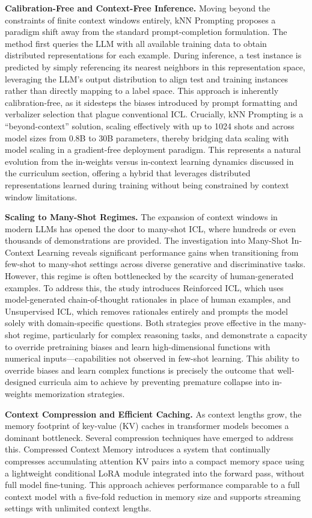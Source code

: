\documentclass[11pt]{article}
\begin{document}
\textbf{Calibration-Free and Context-Free Inference.} Moving beyond the constraints of finite context windows entirely, kNN Prompting \cite{ref206} proposes a paradigm shift away from the standard prompt-completion formulation. The method first queries the LLM with all available training data to obtain distributed representations for each example. During inference, a test instance is predicted by simply referencing its nearest neighbors in this representation space, leveraging the LLM's output distribution to align test and training instances rather than directly mapping to a label space. This approach is inherently calibration-free, as it sidesteps the biases introduced by prompt formatting and verbalizer selection that plague conventional ICL. Crucially, kNN Prompting is a ``beyond-context'' solution, scaling effectively with up to 1024 shots and across model sizes from 0.8B to 30B parameters, thereby bridging data scaling with model scaling in a gradient-free deployment paradigm. This represents a natural evolution from the in-weights versus in-context learning dynamics discussed in the curriculum section, offering a hybrid that leverages distributed representations learned during training without being constrained by context window limitations.

\textbf{Scaling to Many-Shot Regimes.} The expansion of context windows in modern LLMs has opened the door to many-shot ICL, where hundreds or even thousands of demonstrations are provided. The investigation into Many-Shot In-Context Learning \cite{ref15} reveals significant performance gains when transitioning from few-shot to many-shot settings across diverse generative and discriminative tasks. However, this regime is often bottlenecked by the scarcity of human-generated examples. To address this, the study introduces Reinforced ICL, which uses model-generated chain-of-thought rationales in place of human examples, and Unsupervised ICL, which removes rationales entirely and prompts the model solely with domain-specific questions. Both strategies prove effective in the many-shot regime, particularly for complex reasoning tasks, and demonstrate a capacity to override pretraining biases and learn high-dimensional functions with numerical inputs---capabilities not observed in few-shot learning. This ability to override biases and learn complex functions is precisely the outcome that well-designed curricula aim to achieve by preventing premature collapse into in-weights memorization strategies.

\textbf{Context Compression and Efficient Caching.} As context lengths grow, the memory footprint of key-value (KV) caches in transformer models becomes a dominant bottleneck. Several compression techniques have emerged to address this. Compressed Context Memory \cite{ref207} introduces a system that continually compresses accumulating attention KV pairs into a compact memory space using a lightweight conditional LoRA module integrated into the forward pass, without full model fine-tuning. This approach achieves performance comparable to a full context model with a five-fold reduction in memory size and supports streaming settings with unlimited context lengths.
\end{document}
